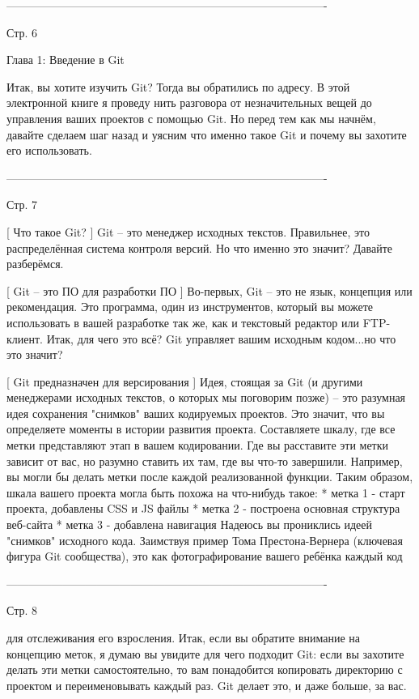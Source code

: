 -------------------------------------------------------------------------------------

Стр. 6

Глава 1: Введение в Git

Итак, вы хотите изучить Git? Тогда вы обратились по адресу. В этой электронной книге
я проведу нить разговора от незначительных вещей до управления ваших проектов с
помощью Git. Но перед тем как мы начнём, давайте сделаем шаг назад и уясним что
именно такое Git и почему вы захотите его использовать.

-------------------------------------------------------------------------------------

Стр. 7

[ Что такое Git? ]
Git -- это менеджер исходных текстов. Правильнее, это распределённая система
контроля версий. Но что именно это значит? Давайте разберёмся.

[ Git -- это ПО для разработки ПО ]
Во-первых, Git -- это не язык, концепция или рекомендация. Это программа, один из
инструментов, который вы можете использовать в вашей разработке так же, как и 
текстовый редактор или FTP-клиент. Итак, для чего это всё? Git управляет вашим 
исходным кодом...но что это значит?

[ Git предназначен для версирования ]
Идея, стоящая за Git (и другими менеджерами исходных текстов, о которых мы поговорим
позже) -- это разумная идея сохранения "снимков" ваших кодируемых проектов. Это 
значит, что вы определяете моменты в истории развития проекта. Составляете шкалу,
где все метки представляют этап в вашем кодировании. Где вы расставите эти метки
зависит от вас, но разумно ставить их там, где вы что-то завершили. Например, вы
могли бы делать метки после каждой реализованной функции. Таким образом, шкала
вашего проекта могла быть похожа на что-нибудь такое:
    * метка 1 - старт проекта, добавлены CSS и JS файлы
    * метка 2 - построена основная структура веб-сайта
    * метка 3 - добавлена навигация
Надеюсь вы прониклись идеей "снимков" исходного кода. Заимствуя пример Тома
Престона-Вернера (ключевая фигура Git сообщества), это как фотографирование вашего
ребёнка каждый код 

-------------------------------------------------------------------------------------

Стр. 8

для отслеживания его взросления. Итак, если вы обратите внимание
на концепцию меток, я думаю вы увидите для чего подходит Git: если вы захотите делать
эти метки самостоятельно, то вам понадобится копировать директорию с проектом и
переименовывать каждый раз. Git делает это, и даже больше, за вас.

